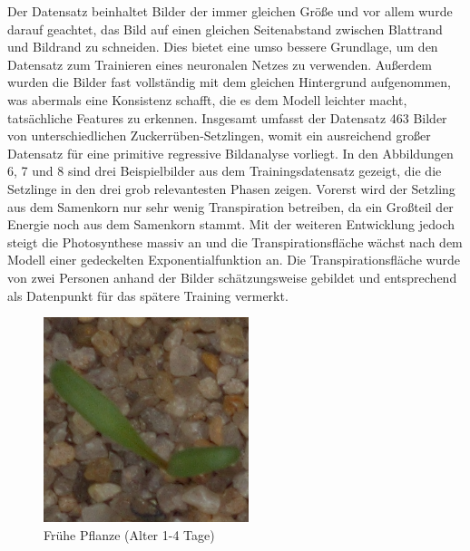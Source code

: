 \newline \par
Der Datensatz beinhaltet Bilder der immer gleichen Größe und vor allem wurde darauf geachtet, das Bild auf einen gleichen Seitenabstand zwischen Blattrand und Bildrand zu schneiden. Dies bietet eine umso bessere Grundlage, um den Datensatz zum Trainieren eines neuronalen Netzes zu verwenden. Außerdem wurden die Bilder fast vollständig mit dem gleichen Hintergrund aufgenommen, was abermals eine Konsistenz schafft, die es dem Modell leichter macht, tatsächliche Features zu erkennen. Insgesamt umfasst der Datensatz 463 Bilder von unterschiedlichen Zuckerrüben-Setzlingen, womit ein ausreichend großer Datensatz für eine primitive regressive Bildanalyse vorliegt. In den Abbildungen 6, 7 und 8 sind drei Beispielbilder aus dem Trainingsdatensatz gezeigt, die die Setzlinge in den drei grob relevantesten Phasen zeigen. Vorerst wird der Setzling aus dem Samenkorn nur sehr wenig Transpiration betreiben, da ein Großteil der Energie noch aus dem Samenkorn stammt. Mit der weiteren Entwicklung jedoch steigt die Photosynthese massiv an und die Transpirationsfläche wächst nach dem Modell einer gedeckelten Exponentialfunktion an. Die Transpirationsfläche wurde von zwei Personen anhand der Bilder schätzungsweise gebildet und entsprechend als Datenpunkt für das spätere Training vermerkt.
\begin{figure}
    \centering
    \includegraphics[width=0.6\linewidth]{4.png}
    \caption{Frühe Pflanze (Alter 1-4 Tage)}
    \label{fig:enter-label}
\end{figure}
